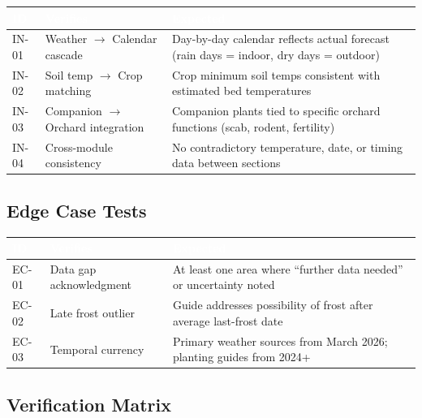 \documentclass[11pt,letterpaper]{article}
\newcommand{\tableheader}[1]{\textbf{\sffamily\textcolor{white}{#1}}}
\begin{document}
\begin{center}
\begin{tabularx}{\textwidth}{C{1.2cm}X L{3cm}}
\toprule
{}
\tableheader{ID} & \tableheader{Verifies} & \tableheader{Expected} \\
\midrule
IN-01 & Weather $\rightarrow$ Calendar cascade & Day-by-day calendar reflects actual forecast (rain days = indoor, dry days = outdoor) \\
IN-02 & Soil temp $\rightarrow$ Crop matching & Crop minimum soil temps consistent with estimated bed temperatures \\
IN-03 & Companion $\rightarrow$ Orchard integration & Companion plants tied to specific orchard functions (scab, rodent, fertility) \\
IN-04 & Cross-module consistency & No contradictory temperature, date, or timing data between sections \\
\bottomrule
\end{tabularx}
\end{center}

\subsection{Edge Case Tests}

\begin{center}
\begin{tabularx}{\textwidth}{C{1.2cm}X L{3cm}}
\toprule
{}
\tableheader{ID} & \tableheader{Verifies} & \tableheader{Expected} \\
\midrule
EC-01 & Data gap acknowledgment & At least one area where ``further data needed'' or uncertainty noted \\
EC-02 & Late frost outlier & Guide addresses possibility of frost after average last-frost date \\
EC-03 & Temporal currency & Primary weather sources from March 2026; planting guides from 2024+ \\
\bottomrule
\end{tabularx}
\end{center}

\subsection{Verification Matrix}
\end{document}
